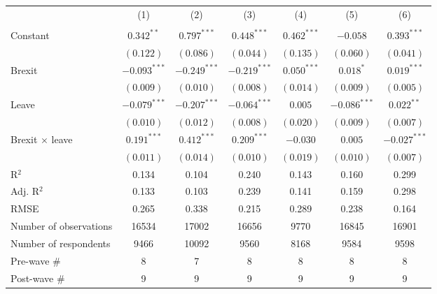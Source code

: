 \documentclass[12pt, letter]{article}
\begin{document}
\begin{table}[t]
\begin{center}
{\begin{tabular}{l c c c c c c}
\\[0pt]
 & (1) & (2) & (3) & (4) & (5) & (6) \\[3pt]
\cmidrule[1pt]{2-7}
\\[-12pt] 
Constant                         & $0.342^{**}$   & $0.797^{***}$  & $0.448^{***}$  & $0.462^{***}$  & $-0.058$       & $0.393^{***}$  \\
                                 & $(0.122)$      & $(0.086)$      & $(0.044)$      & $(0.135)$      & $(0.060)$      & $(0.041)$      \\
Brexit                           & $-0.093^{***}$ & $-0.249^{***}$ & $-0.219^{***}$ & $0.050^{***}$  & $0.018^{*}$    & $0.019^{***}$  \\
                                 & $(0.009)$      & $(0.010)$      & $(0.008)$      & $(0.014)$      & $(0.009)$      & $(0.005)$      \\
Leave                            & $-0.079^{***}$ & $-0.207^{***}$ & $-0.064^{***}$ & $0.005$        & $-0.086^{***}$ & $0.022^{**}$   \\
                                 & $(0.010)$      & $(0.012)$      & $(0.008)$      & $(0.020)$      & $(0.009)$      & $(0.007)$      \\
Brexit $\times$ leave                   & $0.191^{***}$  & $0.412^{***}$  & $0.209^{***}$  & $-0.030$       & $0.005$        & $-0.027^{***}$ \\
                                 & $(0.011)$      & $(0.014)$      & $(0.010)$      & $(0.019)$      & $(0.010)$      & $(0.007)$      \\
\hline
R$^2$                            & 0.134          & 0.104          & 0.240          & 0.143          & 0.160          & 0.299          \\
Adj. R$^2$                       & 0.133          & 0.103          & 0.239          & 0.141          & 0.159          & 0.298          \\
RMSE                             & 0.265          & 0.338          & 0.215          & 0.289          & 0.238          & 0.164          \\
\hline
Number of observations           & 16534          & 17002          & 16656          & 9770           & 16845          & 16901          \\
Number of respondents & 9466 & 10092 & 9560 & 8168 & 9584 & 9598 \\ 
Pre-wave \# & 8 & 7 & 8 & 8 & 8 & 8 \\ 
Post-wave \# & 9 & 9 & 9 & 9 & 9 & 9 \\  

\end{tabular}}
\end{center}
\end{table}
\end{document}
